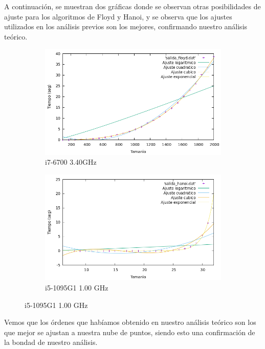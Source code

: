 \documentclass[10pt,a4paper]{article}
\begin{document}
A continuación, se muestran dos gráficas donde se observan otras posibilidades de ajuste para los algoritmos de Floyd y Hanoi, y se observa que los ajustes utilizados en los análisis previos son los mejores, confirmando nuestro análisis teórico.

\begin{figure}[h!]
\begin{subfigure}{.5\textwidth}
	\centering
	\includegraphics[scale=0.25]{../../Images/floy_comparacion.png}
	\caption{i7-6700 3.40GHz}
\end{subfigure}
\begin{subfigure}{.5\textwidth}
	\centering
	\includegraphics[scale=0.25]{../../Images/hanoi_comparacion.png}
	\caption{i5-1095G1 1.00 GHz}
\end{subfigure}
\end{figure}

Vemos que los órdenes que habíamos obtenido en nuestro análisis teórico son los que mejor se ajustan a nuestra nube de puntos, siendo esto una confirmación de la bondad de nuestro análisis.
\end{document}
